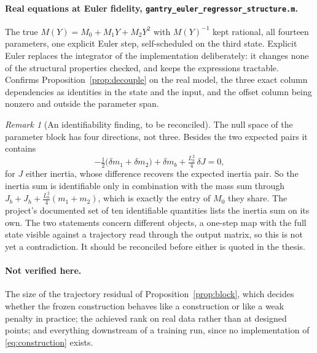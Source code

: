 \documentclass[11pt,a4paper]{article}
\newcommand{\code}[1]{\nolinkurl{#1}}
\theoremstyle{remark}
\newtheorem{remark}[proposition]{Remark}
\begin{document}
\paragraph{Real equations at Euler fidelity, \code{gantry\_euler\_regressor\_structure.m}.}
The true $M(Y)=M_0+M_1Y+M_2Y^2$ with $M(Y)^{-1}$ kept rational, all fourteen parameters, one
explicit Euler step, self-scheduled on the third state. Explicit Euler replaces the integrator of
the implementation deliberately: it changes none of the structural properties checked, and keeps
the expressions tractable. Confirms Proposition~\ref{prop:decouple} on the real model, the three
exact column dependencies as identities in the state and the input, and the offset column being
nonzero and outside the parameter span.

\begin{remark}[An identifiability finding, to be reconciled]
The null space of the parameter block has four directions, not three. Besides the two expected
pairs it contains
\begin{equation}
 -\tfrac{1}{2}\bigl(\delta m_1+\delta m_2\bigr)+\delta m_b+\tfrac{L_b^2}{4}\,\delta J=0,
\end{equation}
for $J$ either inertia, whose difference recovers the expected inertia pair. So the inertia sum is
identifiable only in combination with the mass sum through
$J_b+J_h+\tfrac{L_b^2}{4}(m_1+m_2)$, which is exactly the entry of $M_0$ they share. The
project's documented set of ten identifiable quantities lists the inertia sum on its own. The two
statements concern different objects, a one-step map with the full state visible against a
trajectory read through the output matrix, so this is not yet a contradiction. It should be
reconciled before either is quoted in the thesis.
\end{remark}

\paragraph{Not verified here.} The size of the trajectory residual of
Proposition~\ref{prop:block}, which decides whether the frozen construction behaves like a
construction or like a weak penalty in practice; the achieved rank on real data rather than at
designed points; and everything downstream of a training run, since no implementation of
\eqref{eq:construction} exists.
\end{document}

